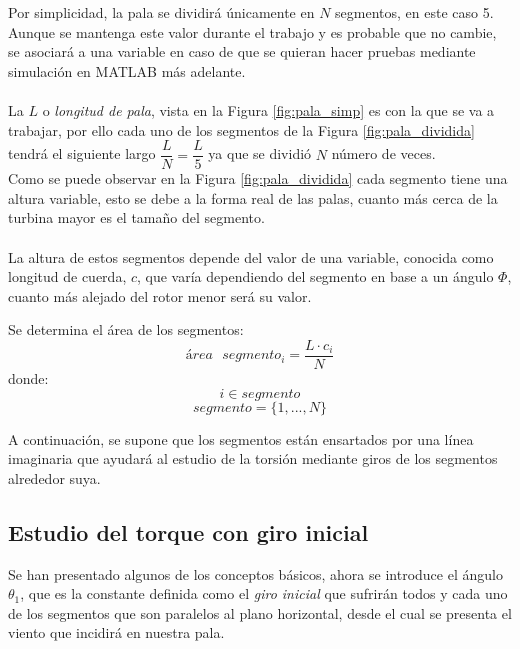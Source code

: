 Por simplicidad, la pala se dividirá únicamente en $N$ segmentos, en este caso 5. Aunque se mantenga este valor durante el trabajo y es probable que no cambie, se asociará a una variable en caso de que se quieran hacer pruebas mediante simulación en MATLAB más adelante. \\\\
    

La $L$ o \textit{longitud de pala}, vista en la Figura \ref{fig:pala_simp} es con la que se va a trabajar, por ello cada uno de los segmentos de la Figura \ref{fig:pala_dividida} tendrá el siguiente largo $\dfrac{L}{N} = \dfrac{L}{5}$ ya que se dividió $N$ número de veces. \\


Como se puede observar en la Figura \ref{fig:pala_dividida} cada segmento tiene una altura variable, esto se debe a la forma real de las palas, cuanto más cerca de la turbina mayor es el tamaño del segmento. \\\\

La altura de estos segmentos depende del valor de una variable, conocida como longitud de cuerda, $c$, que varía dependiendo del segmento en base a un ángulo $\varPhi$, cuanto más alejado del rotor menor será su valor. \\


\begin{definicion}
Se determina el área de los segmentos:
$$ área \text{ } segmento_{i} = \dfrac{L \cdot c_i}{N} $$
donde:
$$ i \in segmento $$
$$ segmento = \{1, ..., N\}$$
\end{definicion}

A continuación, se supone que los segmentos están ensartados por una línea imaginaria que ayudará al estudio de la torsión mediante giros de los segmentos alrededor suya.


\subsection{Estudio del torque con giro inicial}

Se han presentado algunos de los conceptos básicos, ahora se introduce el ángulo $ \theta_1 $, que es la constante definida como el \textit{giro inicial} que sufrirán todos y cada uno de los segmentos que son paralelos al plano horizontal, desde el cual se presenta el viento que incidirá en nuestra pala.\\

